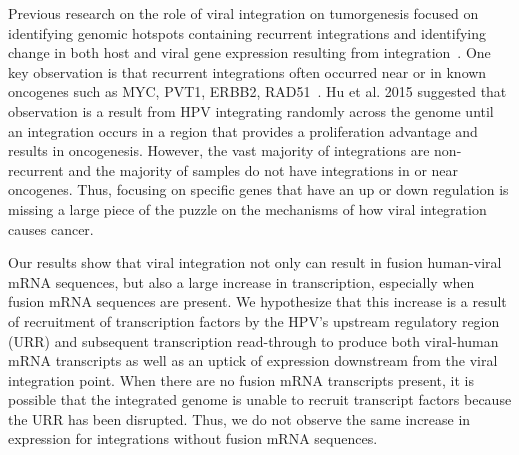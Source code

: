 \documentclass[12pt]{article}
\begin{document}
Previous research on the role of viral integration on tumorgenesis focused on identifying genomic hotspots containing recurrent integrations and identifying change in both host and viral gene expression resulting from integration~\cite{Tang2013,Lawrence2015,Hu2015,Zhang2016}.  One key observation is that recurrent integrations often occurred near or in known oncogenes such as MYC, PVT1, ERBB2, RAD51~\cite{Tang2013}.  Hu et al. 2015 suggested that observation is a result from HPV integrating randomly across the genome until an integration occurs in a region that provides a proliferation advantage and results in oncogenesis.  However, the vast majority of integrations are non-recurrent and the majority of samples do not have integrations in or near oncogenes.  Thus, focusing on specific genes that have an up or down regulation is missing a large piece of the puzzle on the mechanisms of how viral integration causes cancer.

Our results show that viral integration not only can result in fusion human-viral mRNA sequences, but also a large increase in transcription, especially when fusion mRNA sequences are present.  We hypothesize that this increase is a result of recruitment of transcription factors by the HPV's upstream regulatory region (URR) and subsequent transcription read-through to produce both viral-human mRNA transcripts as well as an uptick of expression downstream from the viral integration point.  When there are no fusion mRNA transcripts present, it is possible that the integrated genome is unable to recruit transcript factors because the URR  has been disrupted.  Thus, we do not observe the same increase in expression for integrations without fusion mRNA sequences.
\end{document}
